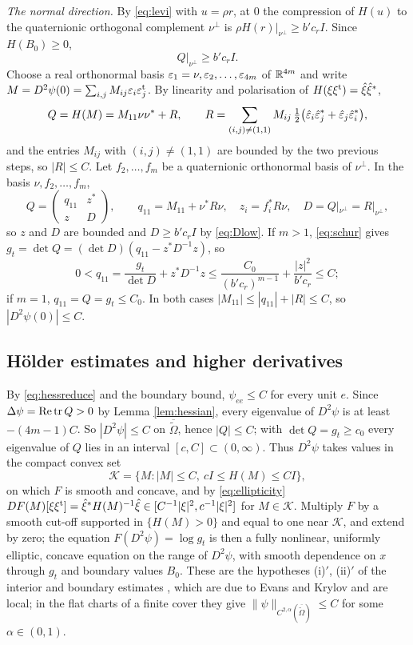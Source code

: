 \emph{The normal direction.} By \eqref{eq:levi} with $u=\rho r$, at $0$ the compression of $H(u)$ to the
quaternionic orthogonal complement $\nu^\perp$ is $\rho H(r)|_{\nu^\perp}\ge b'c_rI$. Since $H(B_0)\ge0$,
\begin{equation}\label{eq:Dlow}
Q|_{\nu^\perp}\ge b'c_rI .
\end{equation}
Choose a real orthonormal basis $\varepsilon_1=\nu,\varepsilon_2,\dots,\varepsilon_{4m}$ of $\mathbb{R}^{4m}$ and write
$M=D^2\psi(0)=\sum_{i,j}M_{ij}\varepsilon_i\varepsilon_j^{\rm t}$. By linearity and polarisation of
$H(\xi\xi^{\rm t})=\hat\xi\hat\xi^*$,
\[
Q=H(M)=M_{11}\nu\nu^*+R,\qquad R=\sum_{(i,j)\ne(1,1)}M_{ij}\,\tfrac12\bigl(\hat{\varepsilon}_i\hat{\varepsilon}_j^*+\hat{\varepsilon}_j\hat{\varepsilon}_i^*\bigr),
\]
and the entries $M_{ij}$ with $(i,j)\ne(1,1)$ are bounded by the two previous steps, so $|R|\le C$.
Let $f_2,\dots,f_m$ be a quaternionic orthonormal basis of $\nu^\perp$. In the basis $\nu,f_2,\dots,f_m$,
\[
Q=\begin{pmatrix}q_{11}&z^*\\z&D\end{pmatrix},\qquad q_{11}=M_{11}+\nu^*R\nu,\quad
z_i=f_i^*R\nu,\quad D=Q|_{\nu^\perp}=R|_{\nu^\perp},
\]
so $z$ and $D$ are bounded and $D\ge b'c_rI$ by \eqref{eq:Dlow}. If $m>1$, \eqref{eq:schur} gives
$g_t=\det Q=(\det D)(q_{11}-z^*D^{-1}z)$, so
\[
0<q_{11}=\frac{g_t}{\det D}+z^*D^{-1}z\le\frac{C_0}{(b'c_r)^{m-1}}+\frac{|z|^2}{b'c_r}\le C;
\]
if $m=1$, $q_{11}=Q=g_t\le C_0$. In both cases $|M_{11}|\le|q_{11}|+|R|\le C$, so $|D^2\psi(0)|\le C$.

\subsection{H\"older estimates and higher derivatives}
By \eqref{eq:hessreduce} and the boundary bound, $\psi_{ee}\le C$ for every unit $e$. Since
$\Delta\psi=\operatorname{Re}\operatorname{tr} Q>0$ by Lemma \ref{lem:hessian}, every eigenvalue of $D^2\psi$ is at least
$-(4m-1)C$. So $|D^2\psi|\le C$ on $\overline{\tilde\Omega}$, hence $|Q|\le C$; with $\det Q=g_t\ge c_0$ every
eigenvalue of $Q$ lies in an interval $[c,C]\subset(0,\infty)$. Thus $D^2\psi$ takes values in the compact
convex set
\[
\mathcal K=\{M:|M|\le C,\ cI\le H(M)\le CI\},
\]
on which $F$ is smooth and concave, and by \eqref{eq:ellipticity}
$DF(M)[\xi\xi^{\rm t}]=\hat\xi^*H(M)^{-1}\hat\xi\in[C^{-1}|\xi|^2,c^{-1}|\xi|^2]$ for $M\in\mathcal K$. Multiply $F$ by a
smooth cut-off supported in $\{H(M)>0\}$ and equal to one near $\mathcal K$, and extend by zero; the
equation $F(D^2\psi)=\log g_t$ is then a fully nonlinear, uniformly elliptic, concave equation on the
range of $D^2\psi$, with smooth dependence on $x$ through $g_t$ and boundary values $B_0$. These are
the hypotheses (i)$'$, (ii)$'$ of the interior and boundary estimates \cite[Theorems 17.14 and
17.26$'$]{GT01}, which are due to Evans \cite{Evans82} and Krylov \cite{Kry83,Kry84} and are local; in
the flat charts of a finite cover they give $\|\psi\|_{C^{2,\alpha}(\overline{\tilde\Omega})}\le C$ for some
$\alpha\in(0,1)$.

